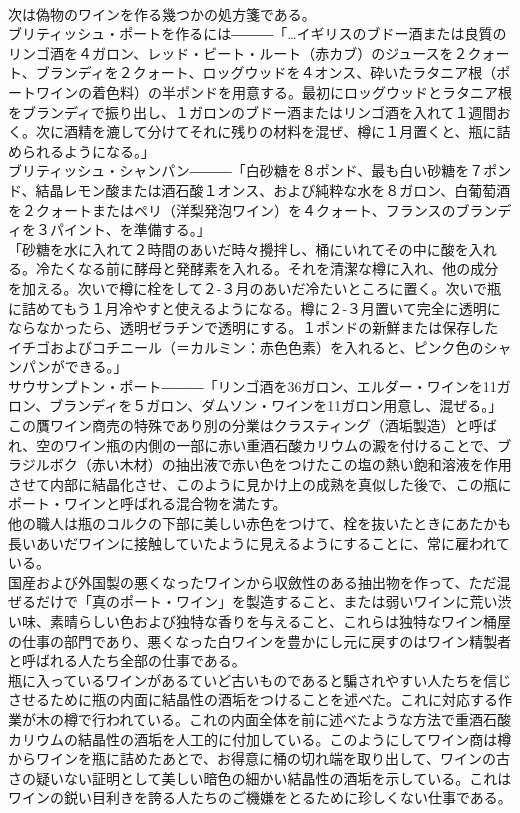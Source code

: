 \documentclass[8pt]{extreport}
\begin{document}
\begin{CJK}{UTF8}{min}
\\	次は偽物のワインを作る幾つかの処方箋である。
\\	ブリティッシュ・ポートを作るには―――「…イギリスのブドー酒または良質のリンゴ酒を４ガロン、レッド・ビート・ルート（赤カブ）のジュースを２クォート、ブランディを２クォート、ロッグウッドを４オンス、砕いたラタニア根（ポートワインの着色料）の半ポンドを用意する。最初にロッグウッドとラタニア根をブランディで振り出し、１ガロンのブドー酒またはリンゴ酒を入れて１週間おく。次に酒精を漉して分けてそれに残りの材料を混ぜ、樽に１月置くと、瓶に詰められるようになる。」
\\	ブリティッシュ・シャンパン―――「白砂糖を８ポンド、最も白い砂糖を７ポンド、結晶レモン酸または酒石酸１オンス、および純粋な水を８ガロン、白葡萄酒を２クォートまたはペリ（洋梨発泡ワイン）を４クォート、フランスのブランディを３パイント、を準備する。」
\\	「砂糖を水に入れて２時間のあいだ時々攪拌し、桶にいれてその中に酸を入れる。冷たくなる前に酵母と発酵素を入れる。それを清潔な樽に入れ、他の成分を加える。次いで樽に栓をして２-３月のあいだ冷たいところに置く。次いで瓶に詰めてもう１月冷やすと使えるようになる。樽に２-３月置いて完全に透明にならなかったら、透明ゼラチンで透明にする。１ポンドの新鮮または保存したイチゴおよびコチニール（＝カルミン：赤色色素）を入れると、ピンク色のシャンパンができる。」
\\	サウサンプトン・ポート―――「リンゴ酒を36ガロン、エルダー・ワインを11ガロン、ブランディを５ガロン、ダムソン・ワインを11ガロン用意し、混ぜる。」
\\	この贋ワイン商売の特殊であり別の分業はクラスティング（酒垢製造）と呼ばれ、空のワイン瓶の内側の一部に赤い重酒石酸カリウムの澱を付けることで、ブラジルボク（赤い木材）の抽出液で赤い色をつけたこの塩の熱い飽和溶液を作用させて内部に結晶化させ、このように見かけ上の成熟を真似した後で、この瓶にポート・ワインと呼ばれる混合物を満たす。
\\	他の職人は瓶のコルクの下部に美しい赤色をつけて、栓を抜いたときにあたかも長いあいだワインに接触していたように見えるようにすることに、常に雇われている。
\\	国産および外国製の悪くなったワインから収斂性のある抽出物を作って、ただ混ぜるだけで「真のポート・ワイン」を製造すること、または弱いワインに荒い渋い味、素晴らしい色および独特な香りを与えること、これらは独特なワイン桶屋の仕事の部門であり、悪くなった白ワインを豊かにし元に戻すのはワイン精製者と呼ばれる人たち全部の仕事である。
\\	瓶に入っているワインがあるていど古いものであると騙されやすい人たちを信じさせるために瓶の内面に結晶性の酒垢をつけることを述べた。これに対応する作業が木の樽で行われている。これの内面全体を前に述べたような方法で重酒石酸カリウムの結晶性の酒垢を人工的に付加している。このようにしてワイン商は樽からワインを瓶に詰めたあとで、お得意に桶の切れ端を取り出して、ワインの古さの疑いない証明として美しい暗色の細かい結晶性の酒垢を示している。これはワインの鋭い目利きを誇る人たちのご機嫌をとるために珍しくない仕事である。

\end{CJK}
\end{document}
